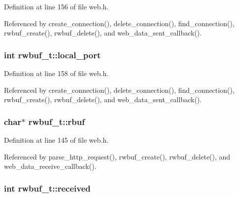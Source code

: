 Definition at line 156 of file web.\+h.



Referenced by create\+\_\+connection(), delete\+\_\+connection(), find\+\_\+connection(), rwbuf\+\_\+create(), rwbuf\+\_\+delete(), and web\+\_\+data\+\_\+sent\+\_\+callback().

\subsubsection[{\texorpdfstring{local\+\_\+port}{local_port}}]{\setlength{\rightskip}{0pt plus 5cm}int rwbuf\+\_\+t\+::local\+\_\+port}\hypertarget{structrwbuf__t_aac758cef289d022f4eb81d4c4fac7f04}{}\label{structrwbuf__t_aac758cef289d022f4eb81d4c4fac7f04}


Definition at line 158 of file web.\+h.



Referenced by create\+\_\+connection(), delete\+\_\+connection(), find\+\_\+connection(), rwbuf\+\_\+create(), rwbuf\+\_\+delete(), and web\+\_\+data\+\_\+sent\+\_\+callback().

\subsubsection[{\texorpdfstring{rbuf}{rbuf}}]{\setlength{\rightskip}{0pt plus 5cm}char$\ast$ rwbuf\+\_\+t\+::rbuf}\hypertarget{structrwbuf__t_afd83372241273849c9395d587b146021}{}\label{structrwbuf__t_afd83372241273849c9395d587b146021}


Definition at line 145 of file web.\+h.



Referenced by parse\+\_\+http\+\_\+request(), rwbuf\+\_\+create(), rwbuf\+\_\+delete(), and web\+\_\+data\+\_\+receive\+\_\+callback().

\subsubsection[{\texorpdfstring{received}{received}}]{\setlength{\rightskip}{0pt plus 5cm}int rwbuf\+\_\+t\+::received}\hypertarget{structrwbuf__t_ac76412a0fbf9dc009ae3f8bb20660883}{}\label{structrwbuf__t_ac76412a0fbf9dc009ae3f8bb20660883}


